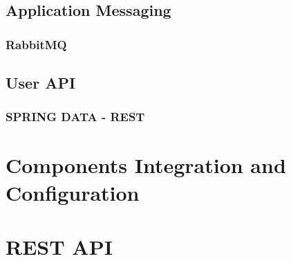 	\subsection{Application Messaging\label{sec:des_me}}
	\subsubsection{RabbitMQ\label{sec:impl_ra_mq}}
	
	\subsection{User API\label{sec:des_api}}
	\subsubsection{SPRING DATA - REST\label{sec:des_api}}

\section{Components Integration and Configuration\label{sec:impl_comp_in}}

\section{REST API\label{sec:impl_rest_api}}